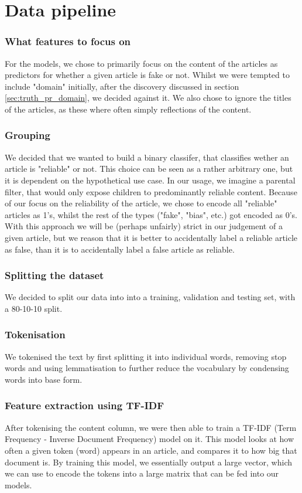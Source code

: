 \section*{Data pipeline}
\subsubsection{What features to focus on}
For the models, we chose to primarily focus on the content of the articles as predictors for whether a given article is
fake or not. Whilst we were tempted to include "domain" initially, after the discovery discussed in section \ref{sec:truth_pr_domain},
we decided against it. We also chose to ignore the titles of the articles, as these where often simply reflections of the
content.

\subsubsection{Grouping}
We decided that we wanted to build a binary classifer, that classifies wether an article is "reliable" or not. This choice can be seen as a rather arbitrary one, but it is dependent on the hypothetical use case. In our usage, we imagine a parental filter, that would only expose children to predominantly reliable content. Because of our focus on the reliability of
the article, we chose to encode all "reliable" articles as 1's, whilst the rest of the types ("fake", "bias", etc.) got
encoded as 0's. With this approach we will be (perhaps unfairly) strict in our judgement of a given article, but we
reason that it is better to accidentally label a reliable article as false, than it is to accidentally label a false
article as reliable.

\subsubsection{Splitting the dataset}
We decided to split our data into into a training, validation and testing set, with a 80-10-10 split.

\subsubsection{Tokenisation}
We tokenised the text by first splitting it into
individual words, removing stop words and using lemmatisation to further reduce the vocabulary by condensing words into
base form.

\subsubsection{Feature extraction using TF-IDF}
After tokenising the content column, we were then able to train a TF-IDF (Term Frequency - Inverse Document Frequency)
model on it. This model looks at how often a given token (word) appears in an article, and compares it to how big that
document is. By training this model, we essentially output a large vector, which we can use to encode the tokens into a
large matrix that can be fed into our models.

